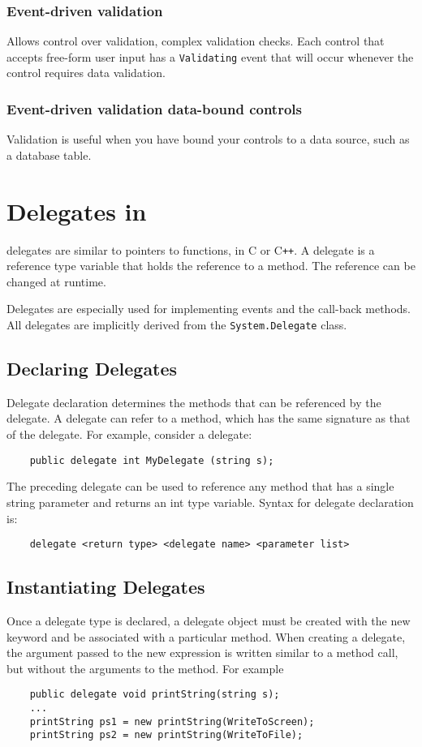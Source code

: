 \subsubsection*{Event-driven validation}
Allows control over validation, complex validation checks. Each control that accepts free-form user input has a \texttt{Validating} event that will occur whenever the control requires data validation.

\subsubsection*{Event-driven validation data-bound controls}
Validation is useful when you have bound your controls to a data source, such as a database table.

\section{Delegates in {\cs}}
{\cs} delegates are similar to pointers to functions, in C or C\texttt{++}. A delegate is a reference type
variable that holds the reference to a method. The reference can be changed at runtime.

Delegates are especially used for implementing events and the call-back methods. All delegates are
implicitly derived from the \texttt{System.Delegate} class.

\subsection*{Declaring Delegates}
Delegate declaration determines the methods that can be referenced by the delegate. A delegate can
refer to a method, which has the same signature as that of the delegate.
For example, consider a delegate:

\begin{lstlisting}
	public delegate int MyDelegate (string s);
\end{lstlisting}

The preceding delegate can be used to reference any method that has a single string parameter and returns an int type variable. Syntax for delegate declaration is:

\begin{lstlisting}
	delegate <return type> <delegate name> <parameter list>
\end{lstlisting}

\subsection*{Instantiating Delegates}
Once a delegate type is declared, a delegate object must be created with the new keyword and be
associated with a particular method. When creating a delegate, the argument passed to the new
expression is written similar to a method call, but without the arguments to the method. For
example
\begin{lstlisting}
	public delegate void printString(string s);
	...
	printString ps1 = new printString(WriteToScreen);
	printString ps2 = new printString(WriteToFile);
\end{lstlisting}

